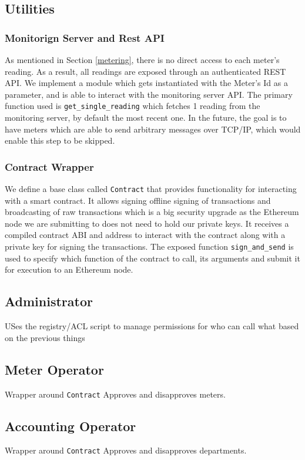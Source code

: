 \subsection{Utilities}
\subsubsection*{Monitorign Server and Rest API}
As mentioned in Section \ref{metering}, there is no direct access to each meter's reading. As a result, all readings are exposed through an authenticated REST API. We implement a module which gets instantiated with the Meter's Id as a parameter, and is able to interact with the monitoring server API. The primary function used is \texttt{get\_single\_reading} which fetches 1 reading from the monitoring server, by default the most recent one. In the future, the goal is to have meters which are able to send arbitrary messages over TCP/IP, which would enable this step to be skipped. 

\subsubsection*{Contract Wrapper}
We define a base class called \texttt{Contract} that provides functionality for interacting  with a smart contract. It allows signing offline signing of transactions and broadcasting of raw transactions which is a big security upgrade as the Ethereum node we are submitting to does not need to hold our private keys. It receives a compiled contract ABI and address to interact with the contract along with a private key for signing the transactions. The exposed function \texttt{sign\_and\_send} is used to specify which function of the contract to call, its arguments and submit it for execution to an Ethereum node.

\subsection{Administrator}
USes the registry/ACL script to manage permissions for who can call what based on the previous things

\subsection{Meter Operator}
Wrapper around \texttt{Contract}
Approves and disapproves meters.

\subsection{Accounting Operator}
Wrapper around \texttt{Contract}
Approves and disapproves departments.

